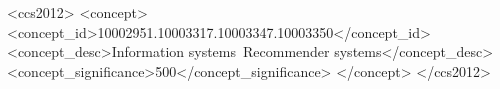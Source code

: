 \documentclass[sigconf]{acmart}
\begin{document}
\begin{CCSXML}
<ccs2012>
  <concept>
    <concept_id>10002951.10003317.10003347.10003350</concept_id>
    <concept_desc>Information systems~Recommender systems</concept_desc>
    <concept_significance>500</concept_significance>
    </concept>
</ccs2012>
\end{CCSXML}



\maketitle












\end{document}
